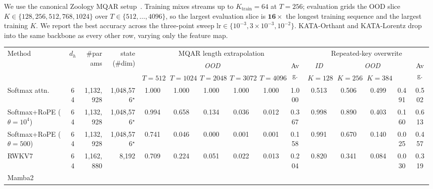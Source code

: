 \documentclass{article}
\newcommand{\1}{\bm{1}}
\newcommand{\seql}{T}
\theoremstyle{definition}
\begin{document}
We use the canonical Zoology MQAR setup~\citep{arora23zoology}. Training mixes streams up to
$K_\text{train}{=}64$ at $\seql=256$; evaluation grids the OOD slice $K\in\{128,256,512,768,1024\}$
over $\seql\in\{512,\dots,4096\}$, so the largest evaluation slice is $\mathbf{16\times}$ the longest
training sequence and the largest training $K$. We report the best accuracy across the three-point
sweep $\mathrm{lr}\in\{10^{-3},3\!\times\!10^{-3},10^{-2}\}$. KATA-Orthant and KATA-Lorentz drop
into the same backbone as every other row, varying only the feature map.
% 
\begin{table}[t]
  \centering
  \fontsize{7.7pt}{9.2pt}\selectfont
  \setlength{\tabcolsep}{2pt}
  \begin{tabular}{l|c|rr|cccccc|ccccc}
    \toprule
    \multirow{3}{*}{Method}
      & \multirow{3}{*}{$d_h$}
      & \multirow{3}{*}{\#params}
      & \multirow{3}{*}{state (\#dim)}
      & \multicolumn{6}{c|}{MQAR length extrapolation}
      & \multicolumn{5}{c}{Repeated-key overwrite} \\
    \cmidrule(lr){5-10}\cmidrule(lr){11-15}
      & & & &
      \multicolumn{5}{c|}{\emph{OOD}}
      & \multirow{2}{*}{Avg.}
      & \multicolumn{1}{c|}{\emph{ID}}
      & \multicolumn{3}{c|}{\emph{OOD}}
      & \multirow{2}{*}{Avg.} \\
    \cmidrule(lr){5-9}\cmidrule(lr){11-11}\cmidrule(lr){12-14}
      & & & &
      $\seql{=}512$ & $\seql{=}1024$ & $\seql{=}2048$ & $\seql{=}3072$ & $\seql{=}4096$ &
      $K{=}64$ & $K{=}128$ & $K{=}256$ & $K{=}384$ & \\
    \midrule
    Softmax attn.
      & 64 & 1{,}132{,}928 & 1{,}048{,}576$^\star$
      & 1.000 & 1.000 & 1.000 & 1.000 & 1.000 & 1.000
      & 0.513 & 0.506 & 0.499 & 0.491 & 0.502 \\
    Softmax+RoPE ($\theta{=}10^4$)
      & 64 & 1{,}132{,}928 & 1{,}048{,}576$^\star$
      & 0.994 & 0.658 & 0.134 & 0.036 & 0.012 & 0.367
      & 0.998 & 0.890 & 0.403 & 0.160 & 0.613 \\
    Softmax+RoPE ($\theta{=}500$)
      & 64 & 1{,}132{,}928 & 1{,}048{,}576$^\star$
      & 0.741 & 0.046 & 0.000 & 0.001 & 0.001 & 0.158
      & 0.991 & 0.670 & 0.140 & 0.025 & 0.457 \\
    \midrule
    RWKV7
      & 64 & 1{,}162{,}880 & 8{,}192
      & 0.709 & 0.224 & 0.051 & 0.022 & 0.013 & 0.204
      & 0.820 & 0.341 & 0.084 & 0.030 & 0.319 \\
    Mamba2

\end{tabular}
\end{table}
\end{document}
